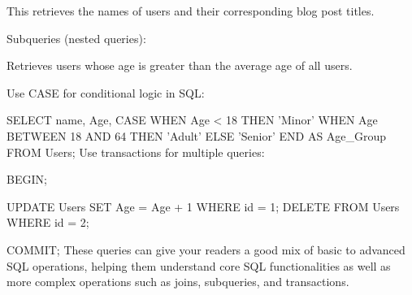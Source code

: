 This retrieves the names of users and their corresponding blog post titles.

Subqueries (nested queries):



Retrieves users whose age is greater than the average age of all users.

Use CASE for conditional logic in SQL:


SELECT name, Age,
CASE
    WHEN Age < 18 THEN 'Minor'
    WHEN Age BETWEEN 18 AND 64 THEN 'Adult'
    ELSE 'Senior'
END AS Age_Group
FROM Users;
Use transactions for multiple queries:


BEGIN;

UPDATE Users SET Age = Age + 1 WHERE id = 1;
DELETE FROM Users WHERE id = 2;

COMMIT;
These queries can give your readers a good mix of basic to advanced SQL operations, helping them understand core SQL functionalities as well as more complex operations such as joins, subqueries, and transactions.

